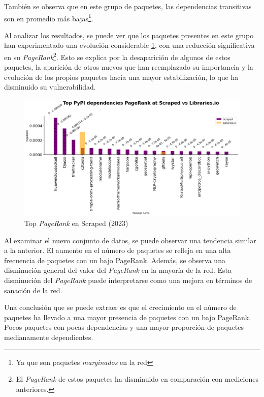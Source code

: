 También se observa que en este grupo de paquetes, las dependencias transitivas son en promedio
más bajas\footnote{Ya que son paquetes \textit{marginados} en la red}.

Al analizar los resultados, se puede ver que los paquetes presentes en este grupo han
experimentado una evolución considerable \ref{fig:Top PageRank en Scraped}, con una reducción significativa en
su \textit{PageRank}\footnote{El \textit{PageRank} de estos paquetes ha disminuido
    en comparación con mediciones anteriores.}. Esto se explica por la desaparición de algunos
de estos paquetes, la aparición de otros nuevos que han reemplazado su importancia y
la evolución de los propios paquetes hacia una mayor estabilización, lo que ha disminuido
su vulnerabilidad.

\begin{figure}[ht!]
    \begin{center}
        \includegraphics[width=1\textwidth]{img/pypi/t20_dep_pr_scraped.png}
        \caption{Top \textit{PageRank} en Scraped (2023)}
        \label{fig:Top PageRank en Scraped}
    \end{center}
\end{figure}

Al examinar el nuevo conjunto de datos, se puede observar una tendencia similar a la anterior.
El aumento en el número de paquetes se refleja en una alta frecuencia de paquetes con un bajo
PageRank. Además, se observa una disminución general del valor del \textit{PageRank} en la mayoría de
la red. Esta disminución del \textit{PageRank} puede interpretarse como una mejora en términos de
sanación de la red.

Una conclusión que se puede extraer es que el crecimiento en el número de paquetes ha llevado
a una mayor presencia de paquetes con un bajo PageRank. Pocos paquetes con pocas dependencias y una mayor
proporción de paquetes medianamente dependientes.

